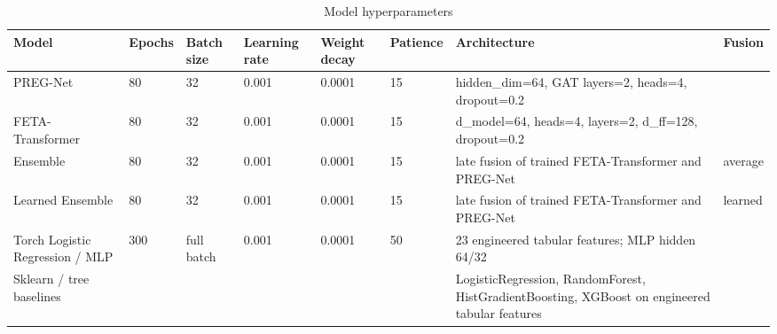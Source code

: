\begin{table}[ht]
\centering
\caption{Model hyperparameters}
\label{tab:hyperparameters}
\begin{tabular}{llllllll}
\hline
Model & Epochs & Batch size & Learning rate & Weight decay & Patience & Architecture & Fusion \\
\hline
PREG-Net & 80 & 32 & 0.001 & 0.0001 & 15 & hidden\_dim=64, GAT layers=2, heads=4, dropout=0.2 &  \\
FETA-Transformer & 80 & 32 & 0.001 & 0.0001 & 15 & d\_model=64, heads=4, layers=2, d\_ff=128, dropout=0.2 &  \\
Ensemble & 80 & 32 & 0.001 & 0.0001 & 15 & late fusion of trained FETA-Transformer and PREG-Net & average \\
Learned Ensemble & 80 & 32 & 0.001 & 0.0001 & 15 & late fusion of trained FETA-Transformer and PREG-Net & learned \\
Torch Logistic Regression / MLP & 300 & full batch & 0.001 & 0.0001 & 50 & 23 engineered tabular features; MLP hidden 64/32 &  \\
Sklearn / tree baselines &  &  &  &  &  & LogisticRegression, RandomForest, HistGradientBoosting, XGBoost on engineered tabular features &  \\
\hline
\end{tabular}
\end{table}
